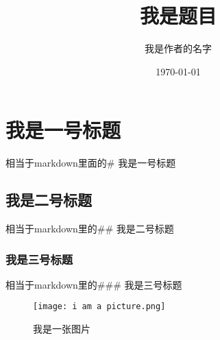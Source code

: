 \documentclass[UTF8]{ctexart}
\title{我是题目}
\author{我是作者的名字}
\date{\today}%
\begin{document}
\maketitle

\section{我是一号标题}
相当于markdown里面的\# 我是一号标题
\subsection{我是二号标题}
相当于markdown里的\#\# 我是二号标题
\subsubsection{我是三号标题}
相当于markdown里的\#\#\# 我是三号标题

\begin{figure}[H]%
\centering%
\texttt{[image: i am a picture.png]}%
\caption{我是一张图片}%
\label{fig:1}%
\end{figure}

\end{document}
